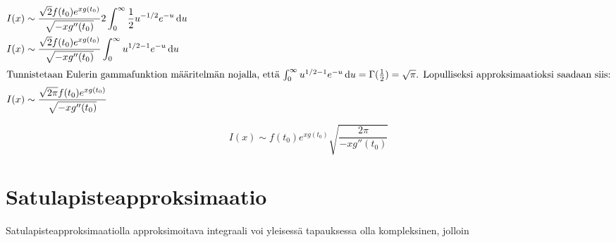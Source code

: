 \documentclass[]{article}
\numberwithin{equation}{section}
\begin{document}
\begin{align}
	I(x) &\sim \frac{\sqrt{2}f(t_0)e^{xg(t_0)}}{\sqrt{-xg''(t_0)}}2\int_{0}^{\infty}\frac{1}{2}u^{-1/2}e^{-u}\odif{u} \\
	I(x) &\sim \frac{\sqrt{2}f(t_0)e^{xg(t_0)}}{\sqrt{-xg''(t_0)}}\int_{0}^{\infty}u^{1/2 - 1}e^{-u}\odif{u} \\
	\intertext{Tunnistetaan Eulerin gammafunktion määritelmän nojalla, että $\int_{0}^{\infty}u^{1/2 - 1}e^{-u}\odif{u} = \Gamma(\frac{1}{2}) = \sqrt{\pi}$. Lopulliseksi approksimaatioksi saadaan siis:}
	I(x) &\sim \frac{\sqrt{2\pi}f(t_0)e^{xg(t_0)}}{\sqrt{-xg''(t_0)}}
\end{align}

\begin{equation}
	\boxed{I(x) \sim f(t_0)e^{xg(t_0)}{\sqrt{\frac{2\pi}{-xg''(t_0)}}}}
\end{equation}

\section{Satulapisteapproksimaatio}

Satulapisteapproksimaatiolla approksimoitava integraali voi yleisessä tapauksessa olla kompleksinen, jolloin 
\end{document}
